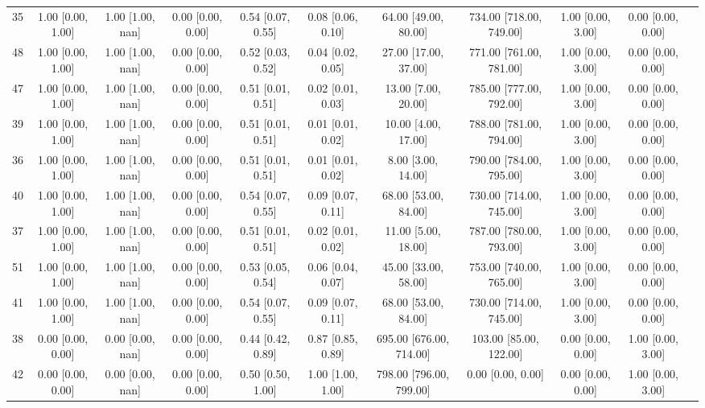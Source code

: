 \documentclass[8pt]{article}
\begin{document}
\begin{center}
\begin{footnotesize}
\begin{longtable}{|ccccccccccc|}
 35 &  1.00 [0.00, 1.00] &  1.00 [1.00, nan] &  0.00 [0.00, 0.00] &  0.54 [0.07, 0.55] &  0.08 [0.06, 0.10] &     64.00 [49.00, 80.00] &  734.00 [718.00, 749.00] &  1.00 [0.00, 3.00] &  0.00 [0.00, 0.00] \\
 48 &  1.00 [0.00, 1.00] &  1.00 [1.00, nan] &  0.00 [0.00, 0.00] &  0.52 [0.03, 0.52] &  0.04 [0.02, 0.05] &     27.00 [17.00, 37.00] &  771.00 [761.00, 781.00] &  1.00 [0.00, 3.00] &  0.00 [0.00, 0.00] \\
 47 &  1.00 [0.00, 1.00] &  1.00 [1.00, nan] &  0.00 [0.00, 0.00] &  0.51 [0.01, 0.51] &  0.02 [0.01, 0.03] &      13.00 [7.00, 20.00] &  785.00 [777.00, 792.00] &  1.00 [0.00, 3.00] &  0.00 [0.00, 0.00] \\
 39 &  1.00 [0.00, 1.00] &  1.00 [1.00, nan] &  0.00 [0.00, 0.00] &  0.51 [0.01, 0.51] &  0.01 [0.01, 0.02] &      10.00 [4.00, 17.00] &  788.00 [781.00, 794.00] &  1.00 [0.00, 3.00] &  0.00 [0.00, 0.00] \\
 36 &  1.00 [0.00, 1.00] &  1.00 [1.00, nan] &  0.00 [0.00, 0.00] &  0.51 [0.01, 0.51] &  0.01 [0.01, 0.02] &       8.00 [3.00, 14.00] &  790.00 [784.00, 795.00] &  1.00 [0.00, 3.00] &  0.00 [0.00, 0.00] \\
 40 &  1.00 [0.00, 1.00] &  1.00 [1.00, nan] &  0.00 [0.00, 0.00] &  0.54 [0.07, 0.55] &  0.09 [0.07, 0.11] &     68.00 [53.00, 84.00] &  730.00 [714.00, 745.00] &  1.00 [0.00, 3.00] &  0.00 [0.00, 0.00] \\
 37 &  1.00 [0.00, 1.00] &  1.00 [1.00, nan] &  0.00 [0.00, 0.00] &  0.51 [0.01, 0.51] &  0.02 [0.01, 0.02] &      11.00 [5.00, 18.00] &  787.00 [780.00, 793.00] &  1.00 [0.00, 3.00] &  0.00 [0.00, 0.00] \\
 51 &  1.00 [0.00, 1.00] &  1.00 [1.00, nan] &  0.00 [0.00, 0.00] &  0.53 [0.05, 0.54] &  0.06 [0.04, 0.07] &     45.00 [33.00, 58.00] &  753.00 [740.00, 765.00] &  1.00 [0.00, 3.00] &  0.00 [0.00, 0.00] \\
 41 &  1.00 [0.00, 1.00] &  1.00 [1.00, nan] &  0.00 [0.00, 0.00] &  0.54 [0.07, 0.55] &  0.09 [0.07, 0.11] &     68.00 [53.00, 84.00] &  730.00 [714.00, 745.00] &  1.00 [0.00, 3.00] &  0.00 [0.00, 0.00] \\
 38 &  0.00 [0.00, 0.00] &  0.00 [0.00, nan] &  0.00 [0.00, 0.00] &  0.44 [0.42, 0.89] &  0.87 [0.85, 0.89] &  695.00 [676.00, 714.00] &   103.00 [85.00, 122.00] &  0.00 [0.00, 0.00] &  1.00 [0.00, 3.00] \\
 42 &  0.00 [0.00, 0.00] &  0.00 [0.00, nan] &  0.00 [0.00, 0.00] &  0.50 [0.50, 1.00] &  1.00 [1.00, 1.00] &  798.00 [796.00, 799.00] &        0.00 [0.00, 0.00] &  0.00 [0.00, 0.00] &  1.00 [0.00, 3.00] \\

\end{longtable}
\end{footnotesize}
\end{center}
\end{document}

